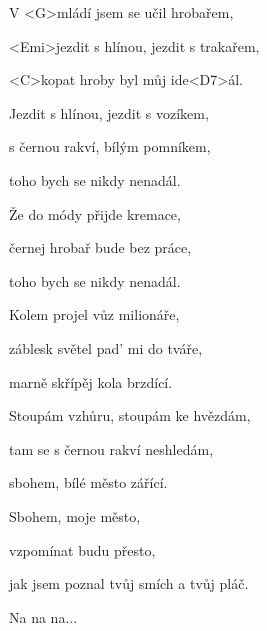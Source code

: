 

\zs
V <G>mládí jsem se učil hrobařem,

<Emi>jezdit s hlínou, jezdit s trakařem,

<C>kopat hroby byl můj ide<D7>ál.
\ks

\zs
Jezdit s hlínou, jezdit s vozíkem,

s černou rakví, bílým pomníkem,

toho bych se nikdy nenadál.
\ks

\zs
Že do módy přijde kremace,

černej hrobař bude bez práce,

toho bych se nikdy nenadál.
\ks

\zs
Kolem projel vůz milionáře,

záblesk světel pad' mi do tváře,

marně skřípěj kola brzdící.
\ks

\zs
Stoupám vzhůru, stoupám ke hvězdám,

tam se s černou rakví neshledám,

sbohem, bílé město zářící.
\ks

\zr
Sbohem, moje město,

vzpomínat budu přesto,

jak jsem poznal tvůj smích a tvůj pláč.
\kr

\zs
Na na na...
\ks

\kp

